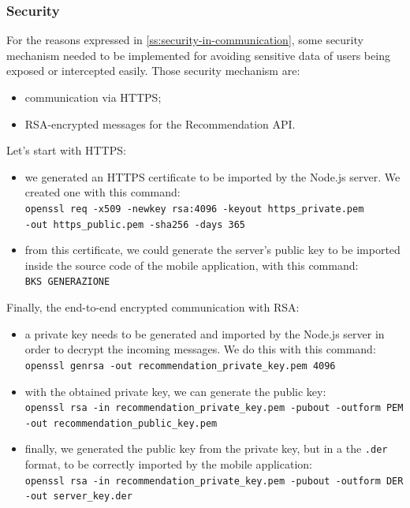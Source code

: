 \documentclass[../../main]{subfiles}
\begin{document}
\subsubsection{Security}
\label{sss:security}

For the reasons expressed in \ref{ss:security-in-communication}, some security mechanism needed to be implemented for avoiding sensitive data of users being exposed or intercepted easily.
Those security mechanism are:
\begin{itemize}
    \item communication via HTTPS;
    \item RSA-encrypted messages for the Recommendation API.
\end{itemize}
\noindent
Let's start with HTTPS:
\begin{itemize}
    \item we generated an HTTPS certificate to be imported by the Node.js server. We created one with this command:\\
    \texttt{openssl req -x509 -newkey rsa:4096 -keyout https\_private.pem}\\
    \texttt{-out https\_public.pem -sha256 -days 365}
    \item from this certificate, we could generate the server's public key to be imported inside the source code of the mobile application, with this command:\\
    \texttt{BKS GENERAZIONE}
\end{itemize}
\noindent
Finally, the end-to-end encrypted communication with RSA:
\begin{itemize}
    \item a private key needs to be generated and imported by the Node.js server in order to decrypt the incoming messages. We do this with this command:\\
    \texttt{openssl genrsa -out recommendation\_private\_key.pem 4096}
    \item with the obtained private key, we can generate the public key:\\
    \texttt{openssl rsa -in recommendation\_private\_key.pem -pubout -outform PEM}\\
    \texttt{-out recommendation\_public\_key.pem}
    \item finally, we generated the public key from the private key, but in a the \texttt{.der} format, to be correctly imported by the mobile application:\\
    \texttt{openssl rsa -in recommendation\_private\_key.pem -pubout -outform DER}\\
    \texttt{-out server\_key.der}
\end{itemize}
\end{document}
